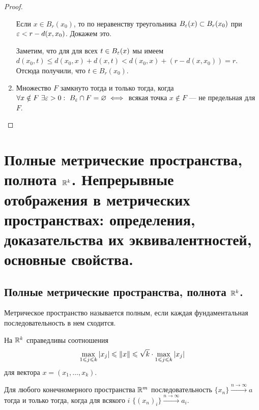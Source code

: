 \documentclass[a4paper]{article}
\theoremstyle{named}
\begin{document}
\begin{lemma*}
\begin{proof}
\begin{enumerate}
                Если $x \in B_r(x_0)$, то по неравенству треугольника $B_{\varepsilon}(x) \subset B_r(x_0)$ при $\varepsilon < r - d(x, x_0)$. Докажем это.

                Заметим, что для для всех $t \in B_{\varepsilon}(x)$ мы имеем $d(x_0, t) \leq d(x_0, x) + d(x, t) < d(x_0, x) + (r - d(x, x_0)) = r$. Отсюда получили, что $t \in B_r(x_0)$.

            \item
                Множество $F$ замкнуто тогда и только тогда, когда $\forall x \notin F \ \exists \varepsilon > 0: \ B_{\varepsilon} \cap F = \varnothing \iff$ всякая точка $x \notin F$ --- не предельная для $F$.
            \end{enumerate}
        \end{proof}
    \end{lemma*}

    \section{Полные метрические пространства, полнота $\mathbb{R}^k$. Непрерывные отображения в метрических пространствах: определения, доказательства их эквивалентностей, основные свойства.}

    \subsection{Полные метрические пространства, полнота $\mathbb{R}^k$.}

    \begin{definition*}
        Метрическое пространство называется полным, если каждая фундаментальная последовательность в нем сходится.
    \end{definition*}

    \begin{remark*}
        На $\mathbb{R}^k$ справедливы соотношения
        \begin{equation*}
            \max\limits_{1 \leqslant j \leqslant k} |x_j| \leqslant \left\lVert x\right\rVert \leqslant \sqrt{k} \cdot \max\limits_{1 \leqslant j \leqslant k} |x_j|
        \end{equation*}
        для вектора $x = (x_1, \dots, x_k)$.
    \end{remark*}

    \begin{theorem*}
        Для любого конечномерного пространства $\mathbb{R}^m$ последовательность $\{x_n\} \xrightarrow{n \to \infty} a$ тогда и только тогда, когда для всякого $i$ $\{(x_n)_i\} \xrightarrow{n \to \infty} a_i$.
    \end{theorem*}
\end{document}

